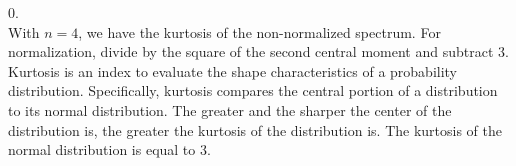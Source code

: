 \documentclass[a4paper,12pt]{article}
\begin{document}
0.
\\
With $n = 4$, we have the kurtosis of the non-normalized spectrum. For normalization,
divide by the square of the second central moment and subtract 3. Kurtosis is an index
to evaluate the shape characteristics of a probability distribution. Specifically, kurtosis
compares the central portion of a distribution to its normal distribution. The greater and
the sharper the center of the distribution is, the greater the kurtosis of the distribution is.
The kurtosis of the normal distribution is equal to 3.
\begin{table}[h]
\caption{The characteristic parameters for the Vietnamese emotional corpus}
\end{table}
\end{document}
